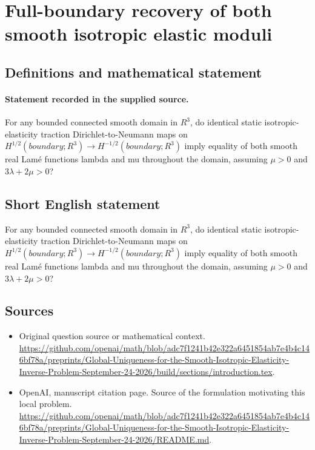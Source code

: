 \documentclass[11pt]{article}
\begin{document}
\section*{Full-boundary recovery of both smooth isotropic elastic moduli}\label{30007337}
\subsection{Definitions and mathematical statement}
\paragraph{Statement recorded in the supplied source.}
For any bounded connected smooth domain in $R^3$, do identical static isotropic-elasticity traction Dirichlet-to-Neumann maps on $H^{1/2}(boundary;R^3)\to H^{-1/2}(boundary;R^3)$ imply equality of both smooth real Lamé functions lambda and mu throughout the domain, assuming $\mu >0$ and $3\lambda +2\mu >0$?
\subsection{Short English statement}
For any bounded connected smooth domain in $R^3$, do identical static isotropic-elasticity traction Dirichlet-to-Neumann maps on $H^{1/2}(boundary;R^3)\to H^{-1/2}(boundary;R^3)$ imply equality of both smooth real Lamé functions lambda and mu throughout the domain, assuming $\mu >0$ and $3\lambda +2\mu >0$?
\subsection{Sources}
\begin{itemize}
\item[S1] Original question source or mathematical context.
\url{https://github.com/openai/math/blob/adc7f1241b42e322a6451854ab7e4b4c146bf78a/preprints/Global-Uniqueness-for-the-Smooth-Isotropic-Elasticity-Inverse-Problem-September-24-2026/build/sections/introduction.tex}.
\item[S2] OpenAI, manuscript citation page. Source of the formulation motivating this local problem.
\url{https://github.com/openai/math/blob/adc7f1241b42e322a6451854ab7e4b4c146bf78a/preprints/Global-Uniqueness-for-the-Smooth-Isotropic-Elasticity-Inverse-Problem-September-24-2026/README.md}.
\end{itemize}
\end{document}
